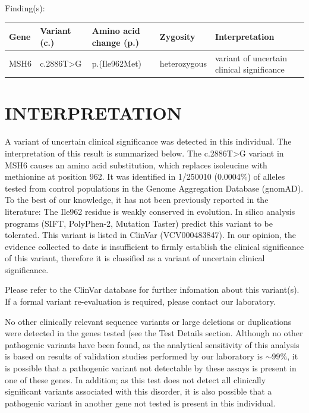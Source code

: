 \documentclass[9pt]{extarticle}
\begin{document}
Finding(s): 

\begin{tabular}{ | p{2cm} | p{2cm} | p{2cm} | p{3.8cm} | p{3.8cm} | }
\hline
{\bf Gene} & {\bf Variant (c.)} & {\bf Amino acid change (p.)} & {\bf Zygosity} & {\bf Interpretation}
\\ \hline
MSH6 & c.2886T>G & p.(Ile962Met) & heterozygous & variant of uncertain clinical significance\\ \hline
\end{tabular}

\section*{INTERPRETATION}
A variant of uncertain clinical significance was detected in this individual. The interpretation of this result is summarized below.
The c.2886T>G variant in MSH6 causes an amino acid substitution, which replaces isoleucine with methionine at position 962. It was identified in 1/250010 (0.0004\%) of alleles tested from control populations in the Genome Aggregation Database (gnomAD). To the best of our knowledge, it has not been previously reported in the literature: The Ile962 residue is weakly conserved in evolution. In silico analysis programs (SIFT, PolyPhen-2, Mutation Taster) predict this variant to be tolerated. This variant is listed in ClinVar (VCV000483847). In our opinion, the evidence collected to date is insufficient to firmly establish the clinical significance of this variant, therefore it is classified as a variant of uncertain clinical significance. 

Please refer to the ClinVar database for further infomation about this variant(s). If a formal variant re-evaluation is required, please contact our laboratory.

No other clinically relevant sequence variants or large deletions or duplications were detected in the genes tested (see the Test Details section. Although no other pathogenic variants have been found, as the analytical sensitivity of this analysis is based on results of validation studies performed by our laboratory is $\sim 99\%$, it is possible that a pathogenic variant not detectable by these assays is present in one of these genes. In addition; as this test does not detect all clinically significant variants associated with this disorder, it is also possible that a pathogenic variant in another gene not tested is present in this individual.
\end{document}
